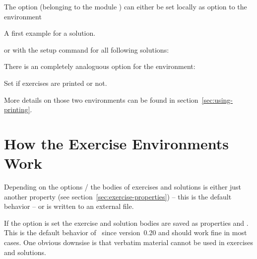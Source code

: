 \documentclass{xsim-manual}
\begin{document}
The option (belonging to the module ) can either be set
locally as option to the  environment
\begin{sourcecode}
  \begin{solution}[print=true]
    A first example for a solution.
  \end{solution}
\end{sourcecode}
or with the setup command for all following solutions:
\begin{sourcecode}
\end{sourcecode}

There is an completely analoguous option for the  environment:
\begin{options}
    Set if exercises are printed or not.
\end{options}
More details on those two environments can be found in
section~\vref{sec:using-printing}.

\section{How the Exercise Environments Work}\label{sec:how-exerc-envir}
Depending on the options
/ the bodies of exercises and solutions is
either just another property (see section~\vref{sec:exercise-properties}) --
this is the default behavior -- or is written to an external file.

If the option  is set the exercise and solution bodies
are saved as properties  and
. This is the default behavior of \xsim\ since
version~0.20 and should work fine in most cases.  One obvious downsise is that
verbatim material cannot be used in exercises and solutions.
\end{document}
